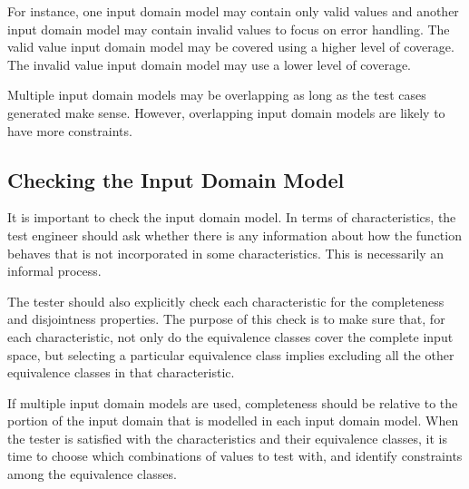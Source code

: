 For instance, one input domain model may contain only valid values and another
input domain model may contain invalid values to focus on error handling. The
valid value input domain model may be covered using a higher level of coverage.
The invalid value input domain model may use a lower level of coverage. 

Multiple input domain models may be overlapping as long as the test cases
generated make sense. However, overlapping input domain models are likely to
have more constraints.

\subsection{Checking the Input Domain Model}

It is important to check the input domain model. In terms of characteristics,
the test engineer should ask whether there is any information about how the
function behaves that is not incorporated in some characteristics. This is
necessarily an informal process.

The tester should also explicitly check each characteristic for the completeness
and disjointness properties. The purpose of this check is to make sure that, for
each characteristic, not only do the equivalence classes cover the complete
input space, but selecting a particular equivalence class implies excluding all
the other equivalence classes in that characteristic. 

If multiple input domain models are used, completeness should be relative to the
portion of the input domain that is modelled in each input domain model. When
the tester is satisfied with the characteristics and their equivalence classes,
it is time to choose which combinations of values to test with, and identify
constraints among the equivalence classes.

